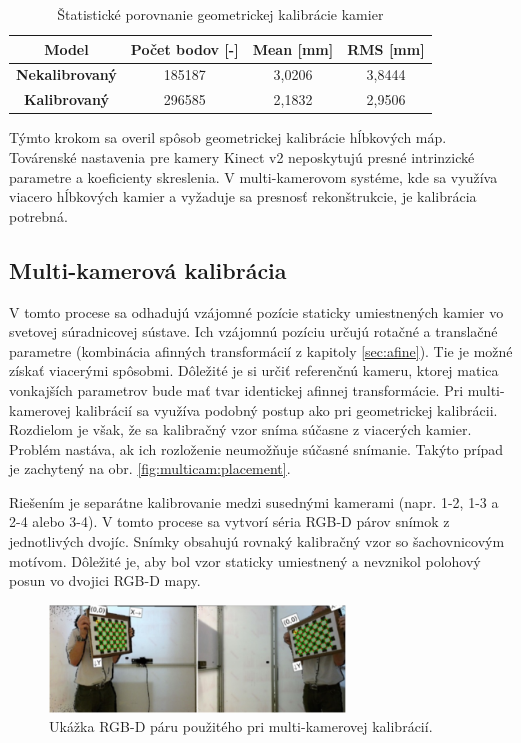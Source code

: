 \begin{table}[H]
	\caption{\label{tab:calib:single} Štatistické porovnanie geometrickej kalibrácie kamier }
	\centering
	\begin{tabular}{cccc}
		\toprule
		\textbf{Model} & \textbf{Počet bodov [-]} & \textbf{Mean [mm]} & \textbf{RMS [mm]} \\ 
		\midrule
		\textbf{Nekalibrovaný} & 185187 & 3,0206	& 3,8444 \\
		\textbf{Kalibrovaný} & 296585   & 2,1832   & 2,9506  \\  
		\bottomrule
	\end{tabular}
\end{table}

Týmto krokom sa overil spôsob geometrickej kalibrácie hĺbkových máp. Továrenské nastavenia pre kamery Kinect v2 neposkytujú presné intrinzické parametre a koeficienty skreslenia. V multi-kamerovom systéme, kde sa využíva viacero hĺbkových kamier a vyžaduje sa presnosť rekonštrukcie, je kalibrácia potrebná. 


\subsection{Multi-kamerová kalibrácia}

V tomto procese sa odhadujú vzájomné pozície staticky umiestnených kamier vo svetovej súradnicovej sústave. Ich vzájomnú pozíciu určujú rotačné a translačné parametre (kombinácia afinných transformácií z kapitoly \ref{sec:afine}). Tie je možné získať viacerými spôsobmi. Dôležité je si určiť referenčnú kameru, ktorej matica vonkajších parametrov bude mať tvar identickej afinnej transformácie. Pri multi-kamerovej kalibrácií sa využíva podobný postup ako pri geometrickej kalibrácii. Rozdielom je však, že sa kalibračný vzor sníma súčasne z viacerých kamier. Problém nastáva, ak ich rozloženie neumožňuje súčasné snímanie. Takýto prípad je zachytený na obr. \ref{fig:multicam:placement}.

Riešením je separátne kalibrovanie medzi susednými kamerami (napr. 1-2, 1-3 a 2-4 alebo 3-4). V tomto procese sa vytvorí séria RGB-D párov snímok z jednotlivých dvojíc. Snímky obsahujú rovnaký kalibračný vzor so šachovnicovým motívom. Dôležité je, aby bol vzor staticky umiestnený a nevznikol polohový posun vo dvojici RGB-D mapy. 


\begin{figure}[H]
	\centering
	\includegraphics[width=0.7\textwidth]{figures/calibration_multi_rgbd.jpg}
	\caption{Ukážka RGB-D páru použitého pri multi-kamerovej kalibrácií.}
	\label{fig:calib:multi:rgbd}
\end{figure}

